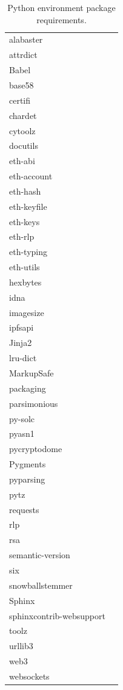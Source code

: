 \documentclass[titlepage]{report}
\begin{document}
\begin{table}
    \begin{center}
        \begin{tabular}{| l | p{5cm} |}
            alabaster\\
            attrdict\\
            Babel\\
            base58\\
            certifi\\
            chardet\\
            cytoolz\\
            docutils\\
            eth-abi\\
            eth-account\\
            eth-hash\\
            eth-keyfile\\
            eth-keys\\
            eth-rlp\\
            eth-typing\\
            eth-utils\\
            hexbytes\\
            idna\\
            imagesize\\
            ipfsapi\\
            Jinja2\\
            lru-dict\\
            MarkupSafe\\
            packaging\\
            parsimonious\\
            py-solc\\
            pyasn1\\
            pycryptodome\\
            Pygments\\
            pyparsing\\
            pytz\\
            requests\\
            rlp\\
            rsa\\
            semantic-version\\
            six\\
            snowballstemmer\\
            Sphinx\\
            sphinxcontrib-websupport\\
            toolz\\
            urllib3\\
            web3\\
            websockets
        \end{tabular}
        \caption{Python environment package requirements.}
    \end{center}
\end{table}
\end{document}
